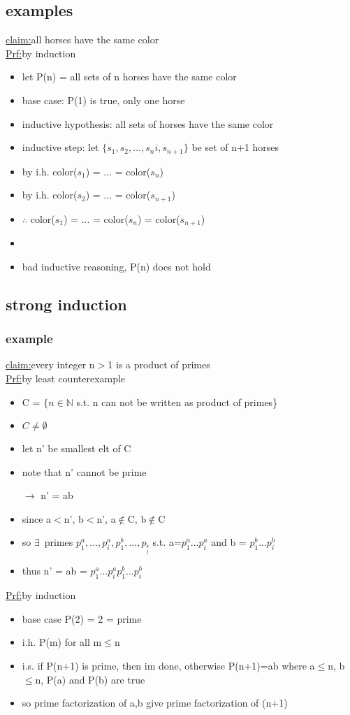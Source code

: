 \documentclass[a4paper]{article}
\newcommand{\ra}{$\rightarrow$}
\newcommand{\te}{$\exists$}
\newcommand{\bi}{\begin{itemize}}
\newcommand{\ei}{\end{itemize}}
\newcommand{\claim}{\underline{claim:}}
\newcommand{\prf}{\underline{Prf:}}
\begin{document}
\begin{itemize}
    \subsection{examples}
      \claim all horses have the same color\\
      \prf by induction
      \bi
        \item let P(n) = all sets of n horses have the same color
        \item base case: P(1) is true, only one horse
        \item inductive hypothesis: all sets of horses have the same color
        \item inductive step: let $\{ s_1,s_2,...,s_ni,s_{n+1}\}$ be set of n+1 horses
        \item by i.h. color($s_1$) = ... = color($s_n$)
        \item by i.h. color($s_2$) = ... = color($s_{n+1}$)
        \item $\therefore$ color($s_1$) = ... = color($s_n$) = color($s_{n+1}$)
        \item
        \item bad inductive reasoning, P(n) does not hold
      \ei
    \subsection{strong induction}
      \subsubsection{example}
        \claim every integer n$>$1 is a product of primes\\
        \prf by least counterexample
        \bi
          \item C = $\{ n \in \mathbb{N}$ s.t. n can not be written as product of
          primes\}
          \item $C \neq \emptyset$
          \item let n' be smallest elt of C
          \item note that n' cannot be prime
          \item[\ra ] n' = ab
          \item since a$<$n', b$<$n', a$\notin$C, b$\notin$C
          \item so \te\ primes $p_1^a,...,p_i^a,p_1^b,...,p__j^b$ s.t.
          a=$p_1^a...p_i^a$ and b = $p_1^b...p_i^b$
          \item thus n' = ab = $p_1^a...p_i^ap_1^b...p_i^b$
        \ei
        \prf by induction
        \bi
          \item base case P(2) = 2 = prime
          \item i.h. P(m) for all m$\leq$n
          \item i.s. if P(n+1) is prime, then im done, otherwise P(n+1)=ab where
          a$\leq$n, b$\leq$n, P(a) and P(b) are true
          \item so prime factorization of a,b give prime factorization of (n+1)
        \ei

\end{itemize}
\end{document}

